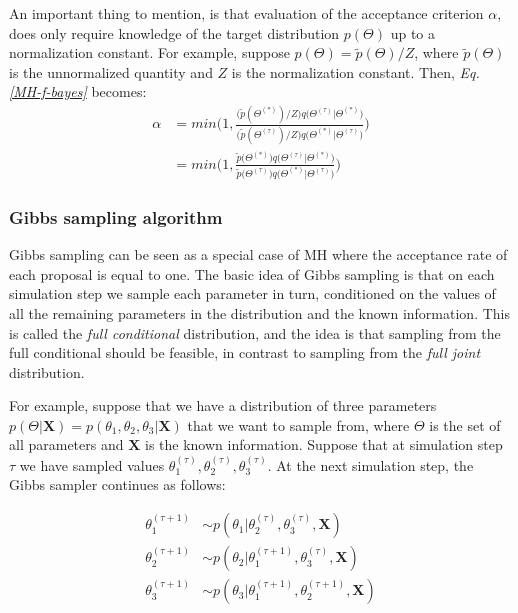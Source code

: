An important thing to mention, is that evaluation of the acceptance criterion $\alpha$, does only require knowledge of the target distribution $p(\Theta)$ up to a normalization constant. For example, suppose $p(\Theta) = \widetilde{p}(\Theta)/Z$, where $\widetilde{p}(\Theta)$ is the unnormalized quantity and $Z$ is the normalization constant. Then, \emph{Eq. \ref{MH-f-bayes}} becomes:
\begin{equation} \label{MH-un-f-bayes}
  \begin{aligned}
	\alpha & = min\bigg(1, \frac{\big(\widetilde{p}(\Theta^{(*)})/Z\big)q\big(\Theta^{(\tau)} | \Theta^{(*)}\big)}{\big(\widetilde{p}(\Theta^{(\tau)})/Z\big) q\big(\Theta^{(*)}|\Theta^{(\tau)}\big)}\bigg) \\
		   & = min\bigg(1, \frac{\widetilde{p}\big(\Theta^{(*)}\big)q\big(\Theta^{(\tau)} | \Theta^{(*)}\big)}{\widetilde{p}\big(\Theta^{(\tau)}\big) q\big(\Theta^{(*)}|\Theta^{(\tau)}\big)}\bigg) 	
  \end{aligned}
\end{equation}

\subsubsection*{Gibbs sampling algorithm}
Gibbs sampling can be seen as a special case of MH where the acceptance rate of each proposal is equal to one. The basic idea of Gibbs sampling is that on each simulation step we sample each parameter in turn, conditioned on the values of all the remaining parameters in the distribution and the known information. This is called the \emph{full conditional} distribution, and the idea is that sampling from the full conditional should be feasible, in contrast to sampling from the \emph{full joint} distribution.

For example, suppose that we have a distribution of three parameters $p(\Theta|\mathbf{X}) = p(\theta_{1}, \theta_{2}, \theta_{3}|\mathbf{X})$ that we want to sample from, where $\Theta$ is the set of all parameters and $\mathbf{X}$ is the known information. Suppose that at simulation step $\tau$ we have sampled values $\theta_{1}^{(\tau)}, \theta_{2}^{(\tau)}, \theta_{3}^{(\tau)}$. At the next simulation step, the Gibbs sampler continues as follows:

\begin{equation} \label{gibbs-f-bayes}
  \begin{aligned}
	\theta_{1}^{(\tau+1)} & \sim p(\theta_{1} | \theta_{2}^{(\tau)}, \theta_{3}^{(\tau)}, \mathbf{X}) \\
	\theta_{2}^{(\tau+1)} & \sim p(\theta_{2} | \theta_{1}^{(\tau+1)}, \theta_{3}^{(\tau)}, \mathbf{X}) \\
	\theta_{3}^{(\tau+1)} & \sim p(\theta_{3} | \theta_{1}^{(\tau+1)}, \theta_{2}^{(\tau+1)}, \mathbf{X}) 
  \end{aligned}
\end{equation}
\vspace*{1mm}

